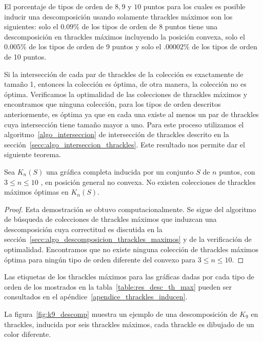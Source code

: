   El porcentaje de tipos de orden de $8,9$ y $10$ puntos para los cuales es posible inducir una
  descomposición usando solamente thrackles máximos son los siguientes: solo el $0.09\%$ de los
  tipos de orden de 8 puntos tiene una descomposición en thrackles máximos incluyendo la posición
  convexa, solo el $0.005\%$ de los tipos de orden de 9 puntos y solo el $.00002\%$ de los tipos de
  orden de 10 puntos.

  Si la intersección de cada par de thrackles de la colección es exactamente de tamaño 1, entonces
  la colección es óptima, de otra manera, la colección no es óptima. Verificamos la optimalidad de
  las colecciones de thrackles máximos y encontramos  que ninguna colección, para los tipos de
  orden descritos anteriormente, es óptima ya que en cada una existe al menos un par de thrackles
  cuya intersección tiene tamaño mayor a uno. Para este proceso utilizamos el
  algoritmo~\ref{algo_interseccion} de intersección de thrackles descrito en la
  sección~\ref{secc:algo_interseccion_thrackles}. Este resultado nos permite dar el siguiente
  teorema.

  \begin{theorem}\label{teo:coleccion_optima}
    Sea $K_n(S)$ una gráfica completa inducida por un conjunto $S$ de $n$ puntos,
    con $3\leq n\leq 10$ , en posición general no convexa. No existen
    colecciones de thrackles máximos óptimas en $K_n(S)$.
  \end{theorem}
  \begin{proof}
    Esta demostración se obtuvo computacionalmente. Se sigue del algoritmo de búsqueda de
    colecciones de thrackles máximos que induzcan una descomposición cuya correctitud es discutida
    en la sección~\ref{secc:algo_descomposicion_thrackles_maximos} y de la verificación de
    optimalidad. Encontramos que no existe ninguna colección de thrackles máximos óptima para
    ningún tipo de orden diferente del convexo para $3\leq n\leq 10$.
  \end{proof}

  Las etiquetas de los thrackles máximos para las gráficas dadas por cada tipo de orden de los
  mostrados en la tabla~\ref{table:res_desc_th_max} pueden ser consultados en el
  apéndice~\ref{apendice_thrackles_inducen}.

  La figura~\ref{fig:k9_descomp} muestra un ejemplo de una descomposición de $K_9$ en thrackles,
  inducida por seis thrackles máximos, cada thrackle es dibujado de un color diferente.

